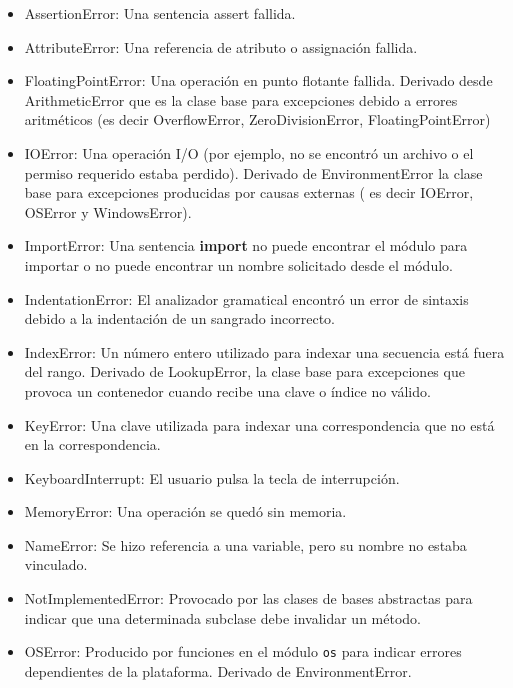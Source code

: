 \documentclass[twoside,10.5pt]{article}%
\begin{document}
\begin{itemize}
\item {\color{blue} AssertionError}: Una sentencia {\color{green}assert} fallida.
\item  {\color{blue} AttributeError}: Una referencia de atributo o assignaci\'on fallida.
\item {\color{blue} FloatingPointError}: Una operaci\'on en punto flotante fallida. Derivado desde {\color{blue} ArithmeticError} que es la clase base para excepciones debido a errores aritm\'eticos (es decir {\color{green} OverflowError}, {\color{green}ZeroDivisionError},  {\color{green}FloatingPointError})
\item {\color{blue} IOError}: Una operaci\'on I/O (por ejemplo, no se encontr\'o un archivo o el permiso requerido estaba perdido). Derivado de {\color{green}EnvironmentError} la clase base para excepciones producidas por causas externas ( es decir {\color{blue} IOError, OSError y WindowsError}).
\item {\color{blue} ImportError}: Una sentencia \textbf{import} no puede encontrar el m\'odulo para importar o no puede encontrar un nombre solicitado desde el m\'odulo.
\item {\color{blue} IndentationError}: El analizador gramatical encontr\'o un error de sintaxis debido a la indentaci\'on de un sangrado incorrecto. 
\item {\color{blue} IndexError}: Un n\'umero entero utilizado para indexar una secuencia est\'a fuera del rango. Derivado de {\color{green}LookupError}, la clase base para excepciones que provoca un contenedor cuando recibe una clave o \'indice no v\'alido.
\item {\color{blue} KeyError}: Una clave utilizada para indexar una correspondencia que no est\'a en la correspondencia.
\item {\color{blue} KeyboardInterrupt}: El usuario pulsa la tecla de interrupci\'on.
\item {\color{blue} MemoryError}: Una operaci\'on se qued\'o sin memoria.
\item {\color{blue} NameError}: Se hizo referencia a una variable, pero su nombre no estaba vinculado.
\item {\color{blue} NotImplementedError}: Provocado por las clases de bases abstractas para indicar que una determinada subclase debe invalidar un m\'etodo. 
\item {\color{blue} OSError}: Producido por funciones en el m\'odulo \texttt{os} para indicar errores dependientes de la plataforma. Derivado de {\color{green}EnvironmentError}.

\end{itemize}
\end{document}
